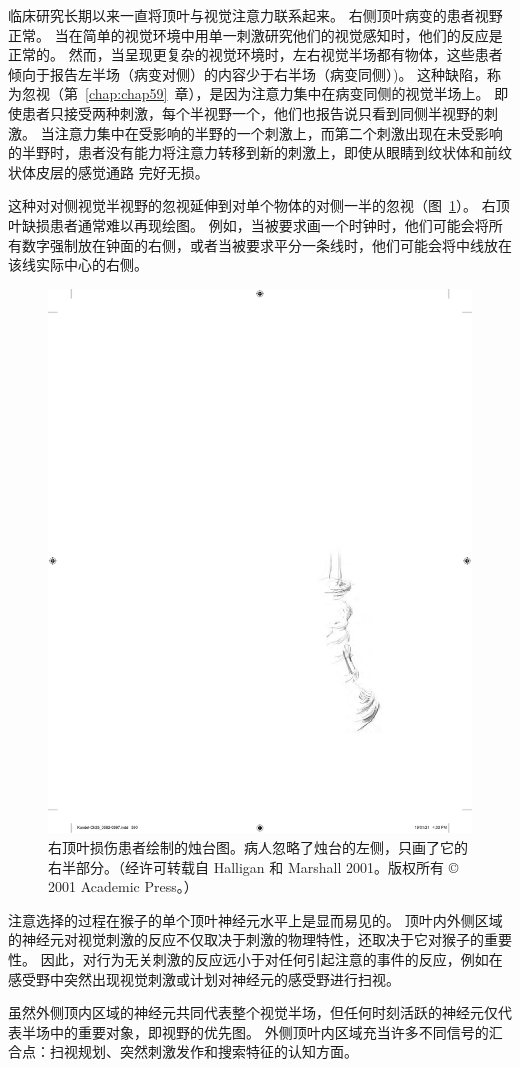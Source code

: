 临床研究长期以来一直将顶叶与视觉注意力联系起来。
右侧顶叶病变的患者视野正常。
当在简单的视觉环境中用单一刺激研究他们的视觉感知时，他们的反应是正常的。
然而，当呈现更复杂的视觉环境时，左右视觉半场都有物体，这些患者倾向于报告左半场（病变对侧）的内容少于右半场（病变同侧）)。
这种缺陷，称为忽视（第~\ref{chap:chap59}~章），是因为注意力集中在病变同侧的视觉半场上。
即使患者只接受两种刺激，每个半视野一个，他们也报告说只看到同侧半视野的刺激。
当注意力集中在受影响的半野的一个刺激上，而第二个刺激出现在未受影响的半野时，患者没有能力将注意力转移到新的刺激上，即使从眼睛到纹状体和前纹状体皮层的感觉通路 完好无损。


这种对对侧视觉半视野的忽视延伸到对单个物体的对侧一半的忽视（图~\ref{fig:25_9}）。
右顶叶缺损患者通常难以再现绘图。
例如，当被要求画一个时钟时，他们可能会将所有数字强制放在钟面的右侧，或者当被要求平分一条线时，他们可能会将中线放在该线实际中心的右侧。


\begin{figure}[htbp]
	\centering
	\includegraphics[width=0.5\linewidth]{chap25/fig_25_9}
	\caption{右顶叶损伤患者绘制的烛台图。病人忽略了烛台的左侧，只画了它的右半部分。（经许可转载自 Halligan 和 Marshall 2001。版权所有 © 2001 Academic Press。）}
	\label{fig:25_9}
\end{figure}


注意选择的过程在猴子的单个顶叶神经元水平上是显而易见的。
顶叶内外侧区域的神经元对视觉刺激的反应不仅取决于刺激的物理特性，还取决于它对猴子的重要性。
因此，对行为无关刺激的反应远小于对任何引起注意的事件的反应，例如在感受野中突然出现视觉刺激或计划对神经元的感受野进行扫视。


虽然外侧顶内区域的神经元共同代表整个视觉半场，但任何时刻活跃的神经元仅代表半场中的重要对象，即视野的优先图。
外侧顶叶内区域充当许多不同信号的汇合点：扫视规划、突然刺激发作和搜索特征的认知方面。


